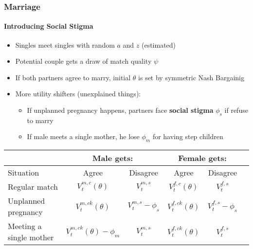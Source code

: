 \documentclass[aspectratio=169]{beamer}
\let\olditem\item
\renewcommand{\item}{%
\olditem\vspace{\fill}}
\begin{document}
\begin{frame}
\frametitle{Marriage}
\framesubtitle{Introducing Social Stigma}
\begin{itemize}
\item Singles meet singles with random $a$ and $z$ (estimated)
\item Potential couple gets a draw of match quality $\psi$
\item If both partners agree to marry, initial $\theta$ is set by symmetric Nash Bargainig
\item More utility shifters (unexplained things):
\begin{itemize}
\item If unplanned pregnancy happens, partners face {\textbf{social stigma}} $\phi_s$ if refuse to marry
\item If male meets a single mother, he lose $\phi_m$ for having step children
\end{itemize}
\end{itemize}
\begin{center}
{\footnotesize
\begin{tabular}{|l||c|c||c|c||c|}\hline
 & \multicolumn{2}{|c||}{Male gets:} & \multicolumn{2}{|c||}{Female gets:} \\\hline
Situation & Agree & Disagree & Agree & Disagree \\\hline
Regular match & $V^{m,c}_t(\theta)$ & $V^{m,s}_t$ & $V^{f,c}_t(\theta)$ & $V^{f,s}_t$ \\
Unplanned pregnancy & $V^{m,ck}_t(\theta)$ & $V^{m,s}_t - \phi_s$ & $V^{f,ck}_t(\theta)$ & $V^{f,s}_t - \phi_s$ \\
Meeting a single mother & $V^{m,ck}_t(\theta) - \phi_m$ & $V^{m,s}_t$ & $V^{f,ck}_t(\theta)$ & $V^{f,s}_t$ \\\hline
\end{tabular}
}
\end{center}
\end{frame}
\end{document}
